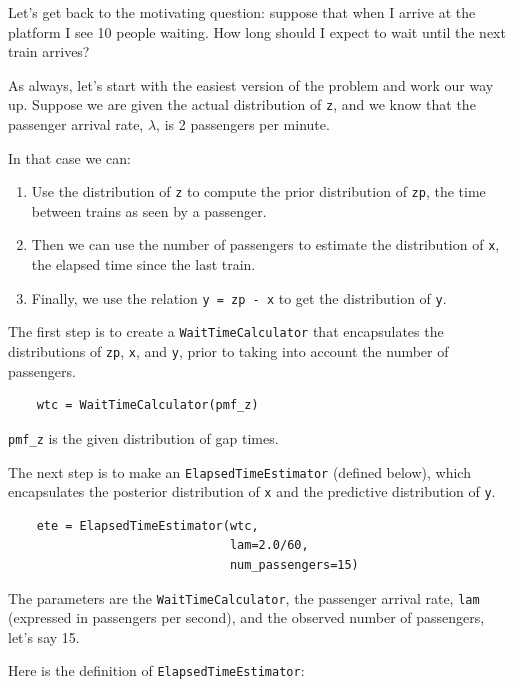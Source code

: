 \documentclass[12pt]{book}
\begin{document}
Let's get back to the motivating question: suppose that when
I arrive at the platform I see 10 people waiting.
How long should I expect to wait until the next train arrives?

As always, let's start with the easiest version of the problem
and work our way up.  Suppose we are given the actual distribution of
{\tt z}, and we know that the passenger arrival rate,
$\lambda$, is 2 passengers per minute.

In that case we can:

\begin{enumerate}

\item Use the distribution of {\tt z} to compute
the prior distribution of {\tt zp}, the time between trains
as seen by a passenger.

\item Then we can use the number of passengers to estimate the distribution
of {\tt x}, the elapsed time since the last train.

\item Finally, we use the relation {\tt y = zp - x} to get the
distribution of {\tt y}.

\end{enumerate}

The first step is to create a {\tt WaitTimeCalculator} that
encapsulates the distributions of {\tt zp}, {\tt x},
and {\tt y}, prior to taking into account the number of
passengers.

\begin{verbatim}
    wtc = WaitTimeCalculator(pmf_z)
\end{verbatim}

\verb"pmf_z" is the given distribution of gap times.

The next step is to make an {\tt ElapsedTimeEstimator} (defined
below), which encapsulates the posterior distribution of {\tt x} and
the predictive distribution of {\tt y}.

\begin{verbatim}
    ete = ElapsedTimeEstimator(wtc,
                               lam=2.0/60,
                               num_passengers=15)
\end{verbatim}

The parameters are the {\tt WaitTimeCalculator}, the passenger
arrival rate, {\tt lam} (expressed in passengers per second),
and the observed number of passengers, let's say 15.

Here is the definition of {\tt ElapsedTimeEstimator}:
\end{document}
